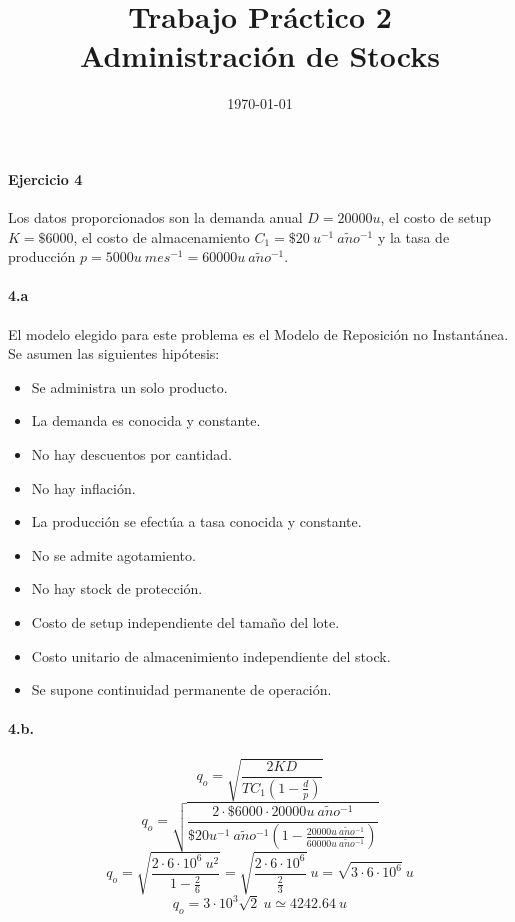 \documentclass{article}
\title{Trabajo Práctico 2\\Administración de Stocks}
\author{}
\date{\today}
\def \anio {a\tilde{n}o}
\begin{document}
\maketitle

\paragraph{Ejercicio 4}
    Los datos proporcionados son la demanda anual $ D = 20000 u $, el costo de setup $ K = \$6000 $, el costo de almacenamiento $ C_1 = \$20\ u^{-1}\ \anio^{-1} $ y la tasa de producción $ p = 5000u\ mes^{-1} = 60000u\ \anio^{-1}$.

    \paragraph{4.a}
    El modelo elegido para este problema es el Modelo de Reposición no Instantánea. Se asumen las siguientes hipótesis:
        \begin{itemize}
            \item Se administra un solo producto.
            \item La demanda es conocida y constante.
            \item No hay descuentos por cantidad.
            \item No hay inflación.
            \item La producción se efectúa a tasa conocida y constante.
            \item No se admite agotamiento.
            \item No hay stock de protección.
            \item Costo de setup independiente del tamaño del lote.
            \item Costo unitario de almacenimiento independiente del stock.
            \item Se supone continuidad permanente de operación.
        \end{itemize}

    \paragraph{4.b.} 
        $$ q_o = \sqrt{ \frac{2KD}{TC_1 \left( 1 - \frac{d}{p} \right)} } $$
        $$ q_o = \sqrt{ \frac{2 \cdot \$ 6000 \cdot 20000u\ \anio^{-1}}{\$20 u^{-1}\ \anio^{-1} \left( 1 - \frac{20000u\ \anio^{-1}}{60000u\ \anio^{-1}} \right)} } $$
        $$ q_o = \sqrt{ \frac{2 \cdot 6 \cdot 10^6\ u^2}{1 - \frac{2}{6}} } = \sqrt{ \frac{2 \cdot 6 \cdot 10^6}{\frac{2}{3}} }\ u = \sqrt{ 3 \cdot 6 \cdot 10^6 }\ u $$
        $$ \boxed{ q_o = 3 \cdot 10^3 \sqrt {2}\ u \simeq 4242.64\ u } $$
\end{document}
